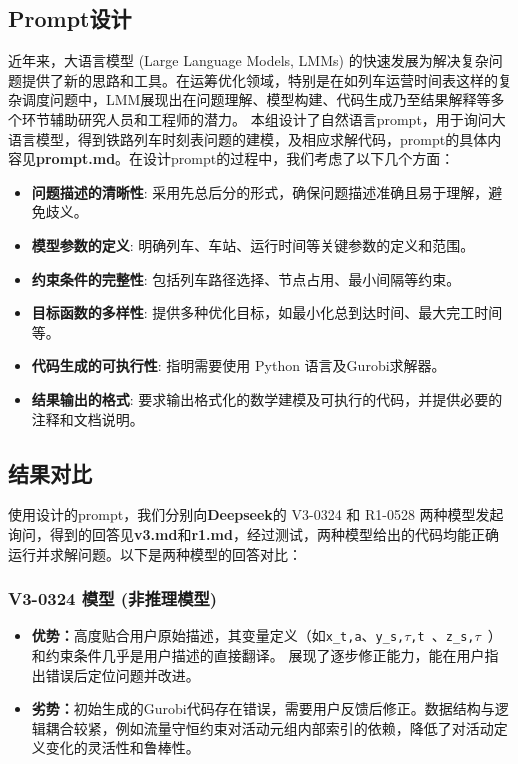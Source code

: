 \documentclass{article}
\begin{document}
\subsection{Prompt设计}
近年来，大语言模型 (Large Language Models, LMMs)
的快速发展为解决复杂问题提供了新的思路和工具。在运筹优化领域，特别是在如列车运营时间表这样的复杂调度问题中，LMM展现出在问题理解、模型构建、代码生成乃至结果解释等多个环节辅助研究人员和工程师的潜力。
本组设计了自然语言prompt，用于询问大语言模型，得到铁路列车时刻表问题的建模，及相应求解代码，prompt的具体内容见\textbf{prompt.md}。在设计prompt的过程中，我们考虑了以下几个方面：
\begin{itemize}
    \item \textbf{问题描述的清晰性}: 采用先总后分的形式，确保问题描述准确且易于理解，避免歧义。
    \item \textbf{模型参数的定义}: 明确列车、车站、运行时间等关键参数的定义和范围。
    \item \textbf{约束条件的完整性}: 包括列车路径选择、节点占用、最小间隔等约束。
    \item \textbf{目标函数的多样性}: 提供多种优化目标，如最小化总到达时间、最大完工时间等。
    \item \textbf{代码生成的可执行性}: 指明需要使用 Python 语言及Gurobi求解器。
    \item \textbf{结果输出的格式}: 要求输出格式化的数学建模及可执行的代码，并提供必要的注释和文档说明。
\end{itemize}

\subsection{结果对比}
使用设计的prompt，我们分别向\textbf{Deepseek}的 V3-0324 和 R1-0528
两种模型发起询问，得到的回答见\textbf{v3.md}和\textbf{r1.md}，经过测试，两种模型给出的代码均能正确运行并求解问题。以下是两种模型的回答对比：

\subsubsection{V3-0324 模型 (非推理模型)}
\begin{itemize}
    \item
        \textbf{优势：}高度贴合用户原始描述，其变量定义（如\texttt{x\_t,a}、\texttt{y\_s,$\tau$,t
        }、\texttt{z\_s,$\tau$ }）和约束条件几乎是用户描述的直接翻译。
        展现了逐步修正能力，能在用户指出错误后定位问题并改进。
    \item
        \textbf{劣势：}初始生成的Gurobi代码存在错误，需要用户反馈后修正。数据结构与逻辑耦合较紧，例如流量守恒约束对活动元组内部索引的依赖，降低了对活动定义变化的灵活性和鲁棒性。
\end{itemize}
\end{document}
